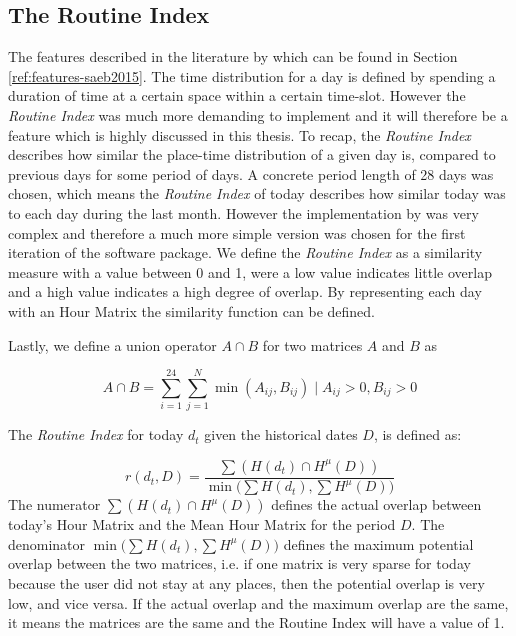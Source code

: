 \subsection{The Routine Index}
The features described in the literature by \cite{Saeb2015} which can be found in Section \ref{ref:features-saeb2015}. The time distribution for a day is defined by spending a duration of time at a certain space within a certain time-slot.  However the \textit{Routine Index} \cite{Saeb2015, Canzian2015} was much more demanding to implement and it will therefore be a feature which is highly discussed in this thesis. To recap, the \textit{Routine Index} describes how similar the place-time distribution of a given day is, compared to previous days for some period of days. A concrete period length of 28 days was chosen, which means the \textit{Routine Index} of today describes how similar today was to each day during the last month. However the implementation by \cite{Canzian2015} was very complex and therefore a much more simple version was chosen for the first iteration of the software package. We define the \textit{Routine Index} as a similarity measure with a value between 0 and 1, were a low value indicates little overlap and a high value indicates a high degree of overlap. By representing each day with an Hour Matrix the similarity function can be defined.

Lastly, we define a union operator $A \cap B$ for two matrices $A$ and $B$ as 

$$A \cap B = \sum_{i=1}^{24} \sum_{j=1}^{N} \min (A_{ij}, B_{ij}) \;|\; A_{ij} > 0, B_{ij} > 0$$

The \textit{Routine Index} for today $d_t$ given the historical dates $D$, is defined as: 

$$r(d_t, D) = \frac{\sum (H(d_t) \cap H^{\mu} (D) )}{\min \Big(\sum H(d_t), \sum H^{\mu} (D) \Big)}$$
The numerator $\sum (H(d_t) \cap H^{\mu} (D) )$ defines the actual overlap between today's Hour Matrix and the Mean Hour Matrix for the period $D$. The denominator $\min \Big(\sum H(d_t), \sum H^{\mu} (D) \Big)$ defines the maximum potential overlap between the two matrices, i.e. if one matrix is very sparse for today because the user did not stay at any places, then the potential overlap is very low, and vice versa. If the actual overlap and the maximum overlap are the same, it means the matrices are the same and the Routine Index will have a value of 1. 


